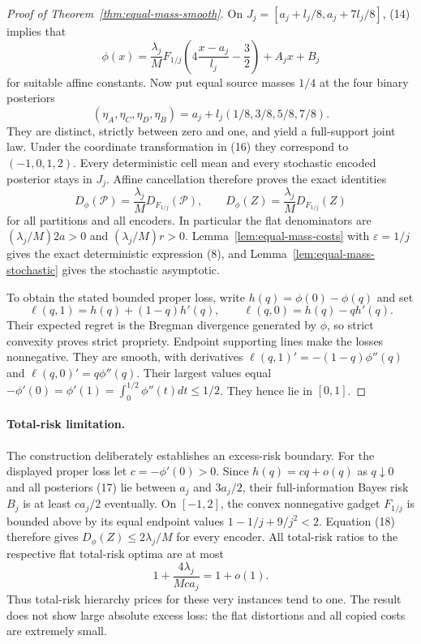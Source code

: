 \begin{proof}[Proof of Theorem~\ref{thm:equal-mass-smooth}]
On $J_j=[a_j+l_j/8,a_j+7l_j/8]$, (14) implies that
\[
 \phi(x)=\frac{\lambda_j}{M}
  F_{1/j}\left(4\frac{x-a_j}{l_j}-\frac32\right)+A_jx+B_j
 \tag{16}\label{eq:equal-local-identity}
\]
for suitable affine constants.  Now put equal source masses $1/4$
at the four binary posteriors
\[
 (\eta_A,\eta_C,\eta_D,\eta_B)
 =a_j+l_j(1/8,3/8,5/8,7/8).
 \tag{17}\label{eq:equal-posteriors}
\]
They are distinct, strictly between zero and one, and yield a full-support
joint law.  Under the coordinate transformation in (16) they correspond
to $(-1,0,1,2)$.  Every deterministic cell mean and every stochastic
encoded posterior stays in $J_j$.  Affine cancellation therefore proves
the exact identities
\[
 D_\phi(\mathcal P)=\frac{\lambda_j}{M}D_{F_{1/j}}(\mathcal P),
 \qquad D_\phi(Z)=\frac{\lambda_j}{M}D_{F_{1/j}}(Z)
 \tag{18}\label{eq:equal-all-encoder-identity}
\]
for all partitions and all encoders.  In particular the flat denominators
are $(\lambda_j/M)2a>0$ and $(\lambda_j/M)r>0$.
Lemma~\ref{lem:equal-mass-costs} with $\varepsilon=1/j$ gives the
exact deterministic expression (8), and
Lemma~\ref{lem:equal-mass-stochastic} gives the stochastic asymptotic.

To obtain the stated bounded proper loss, write
$h(q)=\phi(0)-\phi(q)$ and set
\[
 \ell(q,1)=h(q)+(1-q)h'(q),\qquad
 \ell(q,0)=h(q)-qh'(q).
\]
Their expected regret is the Bregman divergence generated by $\phi$,
so strict convexity proves strict propriety.  Endpoint supporting lines
make the losses nonnegative.  They are smooth, with derivatives
$\ell(q,1)'=-(1-q)\phi''(q)$ and
$\ell(q,0)'=q\phi''(q)$.  Their largest values equal
$-\phi'(0)=\phi'(1)=\int_0^{1/2}\phi''(t)dt\leq1/2$.
They hence lie in $[0,1]$.
\end{proof}

\paragraph{Total-risk limitation.}
The construction deliberately establishes an excess-risk boundary.
For the displayed proper loss let $c=-\phi'(0)>0$.  Since
$h(q)=cq+o(q)$ as $q\downarrow0$ and all posteriors (17) lie between
$a_j$ and $3a_j/2$, their full-information Bayes risk $B_j$ is at least
$ca_j/2$ eventually.  On $[-1,2]$, the convex nonnegative gadget
$F_{1/j}$ is bounded above by its equal endpoint values
$1-1/j+9/j^2<2$.  Equation (18) therefore gives
$D_\phi(Z)\leq2\lambda_j/M$ for every encoder.  All total-risk ratios
to the respective flat total-risk optima are at most
\[
 1+\frac{4\lambda_j}{Mca_j}=1+o(1).
\]
Thus total-risk hierarchy prices for these very instances tend to one.
The result does not show large absolute excess loss: the flat distortions
and all copied costs are extremely small.

